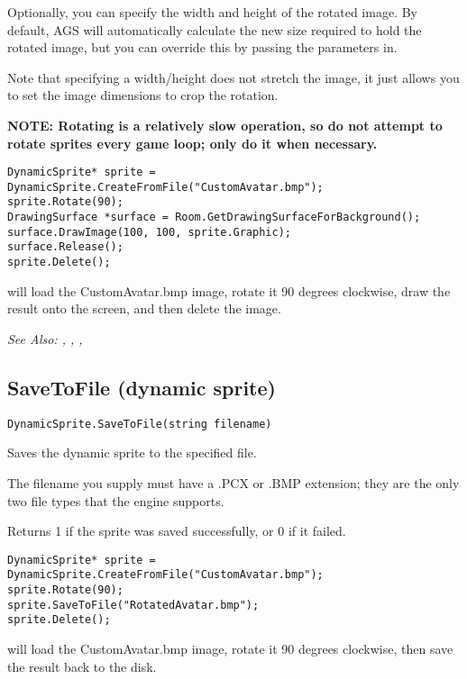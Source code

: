Optionally, you can specify the width and height of the rotated image. By default, AGS
will automatically calculate the new size required to hold the rotated image, but
you can override this by passing the parameters in.

Note that specifying a width/height does not stretch the image, it just allows you
to set the image dimensions to crop the rotation.

\bf{NOTE:} Rotating is a relatively slow operation, so do not attempt to rotate sprites
every game loop; only do it when necessary.

\begin{verbatim}
DynamicSprite* sprite = DynamicSprite.CreateFromFile("CustomAvatar.bmp");
sprite.Rotate(90);
DrawingSurface *surface = Room.GetDrawingSurfaceForBackground();
surface.DrawImage(100, 100, sprite.Graphic);
surface.Release();
sprite.Delete();
\end{verbatim}
will load the CustomAvatar.bmp image, rotate it 90 degrees clockwise, draw the result
onto the screen, and then delete the image.

\it{See Also:} ,
,
,


\subsection{SaveToFile (dynamic sprite)}\label{DynamicSprite.SaveToFile}%

\begin{verbatim}
DynamicSprite.SaveToFile(string filename)
\end{verbatim}
Saves the dynamic sprite to the specified file.

The filename you supply must have a .PCX or .BMP extension; they are the only
two file types that the engine supports.

Returns 1 if the sprite was saved successfully, or 0 if it failed.

\begin{verbatim}
DynamicSprite* sprite = DynamicSprite.CreateFromFile("CustomAvatar.bmp");
sprite.Rotate(90);
sprite.SaveToFile("RotatedAvatar.bmp");
sprite.Delete();
\end{verbatim}
will load the CustomAvatar.bmp image, rotate it 90 degrees clockwise, then
save the result back to the disk.

